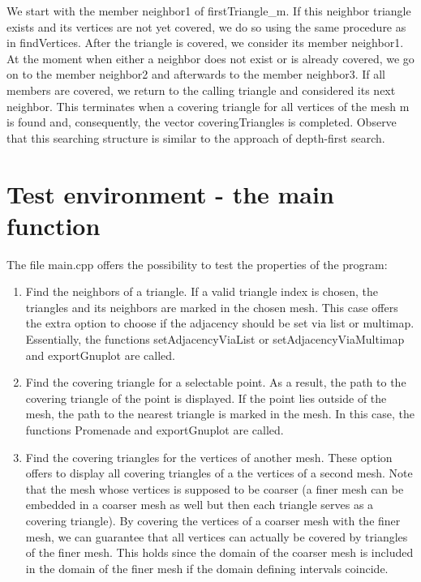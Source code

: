 \documentclass[10pt]{article}
\begin{document}
We start with the member {\ttfamily neighbor1} of {\ttfamily firstTriangle\_m}. If this neighbor triangle exists and its vertices are not yet covered, we do so using the same procedure as in {\ttfamily findVertices}. After the triangle is covered, we consider its member {\ttfamily neighbor1}. At the moment when either a neighbor does not exist or is already covered, we go on to the member {\ttfamily neighbor2} and afterwards to the member {\ttfamily neighbor3}. If all members are covered, we return to the calling triangle and considered its next neighbor. This terminates when a covering triangle for all vertices of the mesh {\ttfamily m} is found and, consequently, the vector {\ttfamily coveringTriangles} is completed. Observe that this searching structure is similar to the approach of depth-first search.


\section{Test environment - the main function}
	The file main.cpp offers the possibility to test the properties of the program:
	\begin{enumerate}
		\item 
		Find the neighbors of a triangle.
		If a valid triangle index is chosen, the triangles and its neighbors are marked in the chosen mesh. This case offers the extra option to choose if the adjacency should be set via list or multimap. Essentially, the functions 
		{\ttfamily setAdjacencyViaList} or {\ttfamily setAdjacencyViaMultimap} and {\ttfamily exportGnuplot} are called. 
		\item 
		Find the covering triangle for a selectable point. 
		As a result, the path to the covering triangle of the point is displayed. 
		If the point lies outside of the mesh, the path to the nearest triangle is marked in the mesh. 
		In this case, the functions {\ttfamily Promenade} and {\ttfamily exportGnuplot} are called.
		\item 
		Find the covering triangles for the vertices of another mesh. These option offers to display all covering triangles of a the vertices of a second mesh. Note that the mesh whose vertices is supposed to be coarser (a finer mesh can be embedded in a coarser mesh as well but then each triangle serves as a covering triangle). By covering the vertices of a coarser mesh with the finer mesh, we can guarantee that all vertices can actually be covered by triangles of the finer mesh. This holds since the domain of the coarser mesh is included in the domain of the finer mesh if the domain defining intervals coincide.
	\end{enumerate}
\end{document}
